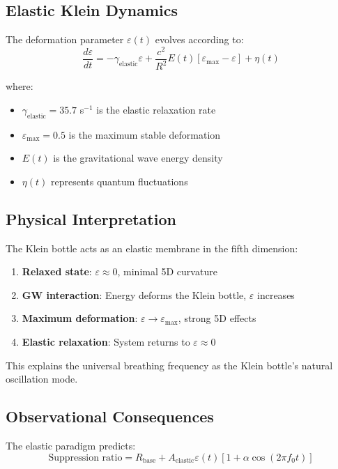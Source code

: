 \documentclass[12pt]{iopart}
\begin{document}
\subsection{Elastic Klein Dynamics}

The deformation parameter $\varepsilon(t)$ evolves according to:
\begin{equation}
\frac{d\varepsilon}{dt} = -\gamma_{\text{elastic}}\varepsilon + \frac{c^2}{R^2}E(t)[\varepsilon_{\max} - \varepsilon] + \eta(t)
\end{equation}

where:
\begin{itemize}
\item $\gamma_{\text{elastic}} = 35.7$ s$^{-1}$ is the elastic relaxation rate
\item $\varepsilon_{\max} = 0.5$ is the maximum stable deformation
\item $E(t)$ is the gravitational wave energy density
\item $\eta(t)$ represents quantum fluctuations
\end{itemize}

\subsection{Physical Interpretation}

The Klein bottle acts as an elastic membrane in the fifth dimension:
\begin{enumerate}
\item \textbf{Relaxed state}: $\varepsilon \approx 0$, minimal 5D curvature
\item \textbf{GW interaction}: Energy deforms the Klein bottle, $\varepsilon$ increases
\item \textbf{Maximum deformation}: $\varepsilon \to \varepsilon_{\max}$, strong 5D effects
\item \textbf{Elastic relaxation}: System returns to $\varepsilon \approx 0$
\end{enumerate}

This explains the universal breathing frequency as the Klein bottle's natural oscillation mode.

\subsection{Observational Consequences}

The elastic paradigm predicts:
\begin{equation}
\text{Suppression ratio} = R_{\text{base}} + A_{\text{elastic}}\varepsilon(t)[1 + \alpha\cos(2\pi f_0 t)]
\end{equation}
\end{document}
